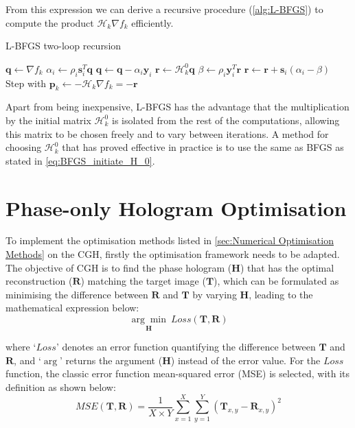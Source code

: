 From this expression we can derive a recursive procedure (\cref{alg:L-BFGS}) to compute the product $\mathcal{H}_{k} \nabla f_k$ efficiently.

\begin{algorithm}[H]
  \caption{L-BFGS two-loop recursion \cite{Nocedal2006}}\label{alg:L-BFGS}
  \begin{algorithmic}
    \State $\textbf{q} \gets \nabla f_k$
    \State $\alpha_i \gets \rho_i \textbf{s}_i^T \textbf{q}$
    \State $ \textbf{q} \gets \textbf{q} - \alpha_i\textbf{y}_i$
    \EndFor
    \State $\textbf{r}\gets \mathcal{H}_k^0 \textbf{q}$
    \State $\beta \gets \rho_i \textbf{y}_i^T \textbf{r}$
    \State $ \textbf{r} \gets \textbf{r} +\textbf{s}_i (\alpha_i-\beta)$
    \EndFor
    \State Step with $\textbf{p}_k \gets -\mathcal{H}_k \nabla f_{k} = -\textbf{r}$
  \end{algorithmic}
\end{algorithm}

Apart from being inexpensive, L-BFGS has the advantage that the multiplication by the initial matrix $\mathcal{H}_k^0$ is isolated from the rest of the computations, allowing this matrix to be chosen freely and to vary between iterations. A method for choosing $\mathcal{H}_k^0$ that has proved effective in practice is to use the same as BFGS as stated in \cref{eq:BFGS_initiate_H_0}. \cite{Nocedal2006}



\section{Phase-only Hologram Optimisation} \label{sec:Optimisation of Phase Hologram for a Target Image}

To implement the optimisation methods listed in \cref{sec:Numerical Optimisation Methods} on the CGH, firstly the optimisation framework needs to be adapted. The objective of CGH is to find the phase hologram ($\textbf{H}$) that has the optimal reconstruction ($\textbf{R}$) matching the target image ($\textbf{T}$), which can be formulated as minimising the difference between $\textbf{R}$ and $\textbf{T}$ by varying $\textbf{H}$, leading to the mathematical expression below:
\begin{equation}
	\underset{\textbf{H}}{\arg \min}\ Loss(\textbf{T}, \textbf{R})
\end{equation}

where `$Loss$' denotes an error function quantifying the difference between $\textbf{T}$ and $\textbf{R}$, and `$\arg$' returns the argument ($\textbf{H}$) instead of the error value. For the $Loss$ function, the classic error function mean-squared error (MSE) \cite{MSE_REF} is selected, with its definition as shown below:
\begin{equation}
  MSE(\textbf{T}, \textbf{R}) = \frac{1}{X\times Y} \sum_{x=1}^{X} \sum_{y=1}^{Y} (\textbf{T}_{x,y}-\textbf{R}_{x,y})^2
  \label{eq:MSE}
\end{equation}


